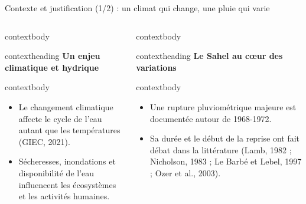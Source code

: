 \documentclass[aspectratio=169,11pt]{beamer}
\begin{document}
\begin{frame}{Contexte et justification (1/2) : un climat qui change, une pluie qui varie}
  \begin{columns}[T,onlytextwidth]
      \begin{beamercolorbox}[wd=\linewidth,rounded=true,sep=0pt]{contextbody}
        \begin{beamercolorbox}[wd=\linewidth,ht=0.40cm,dp=0.08cm,leftskip=0.16cm]{contextheading}
          \bfseries Un enjeu climatique et hydrique
        \end{beamercolorbox}
        \begin{beamercolorbox}[wd=\linewidth,sep=0.08cm]{contextbody}
          \footnotesize
          \begin{itemize}
            \setlength\itemsep{0.10cm}
            \item Le changement climatique affecte le cycle de l'eau autant que les températures (GIEC, 2021).
            \item Sécheresses, inondations et disponibilité de l'eau influencent les écosystèmes et les activités humaines.
          \end{itemize}
        \end{beamercolorbox}
      \end{beamercolorbox}
      \vspace{0.20cm}
      \begin{beamercolorbox}[wd=\linewidth,rounded=true,sep=0pt]{contextbody}
        \begin{beamercolorbox}[wd=\linewidth,ht=0.40cm,dp=0.08cm,leftskip=0.16cm]{contextheading}
          \bfseries Le Sahel au cœur des variations
        \end{beamercolorbox}
        \begin{beamercolorbox}[wd=\linewidth,sep=0.08cm]{contextbody}
          \footnotesize
          \begin{itemize}
            \setlength\itemsep{0.10cm}
            \item Une rupture pluviométrique majeure est documentée autour de 1968-1972.
            \item Sa durée et le début de la reprise ont fait débat dans la littérature (Lamb, 1982 ; Nicholson, 1983 ; Le Barbé et Lebel, 1997 ; Ozer et al., 2003).
          \end{itemize}
        \end{beamercolorbox}
      \end{beamercolorbox}

\end{columns}
\end{frame}
\end{document}
